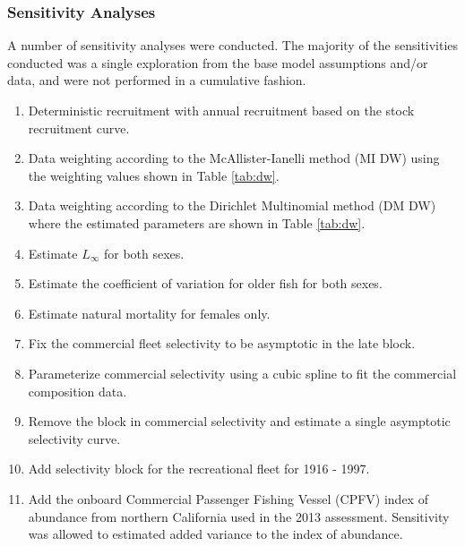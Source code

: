 \documentclass[11pt,
  english,
  a4paper,
]{article}
\begin{document}
\leavevmode\tagmcend\tagstructend\par


\hypertarget{sensitivity-analyses}{%
\subsubsection{Sensitivity Analyses}\label{sensitivity-analyses}}

\leavevmode\tagmcend\tagstructend


A number of sensitivity analyses were conducted. The majority of the sensitivities conducted was a single exploration from the base model assumptions and/or data, and were not performed in a cumulative fashion.

\leavevmode\tagmcend\tagstructend\par

\begin{enumerate}
   
  \item Deterministic recruitment with annual recruitment based on the stock recruitment curve. 

  \item Data weighting according to the McAllister-Ianelli method (MI DW) using the weighting values shown in Table \ref{tab:dw}. 
  
  \item Data weighting according to the Dirichlet Multinomial method (DM DW) where the estimated parameters are shown in Table \ref{tab:dw}. 

  \item Estimate $L_{\infty}$ for both sexes.

  \item Estimate the coefficient of variation for older fish for both sexes.

  \item Estimate natural mortality for females only.

  \item Fix the commercial fleet selectivity to be asymptotic in the late block.

  \item Parameterize commercial selectivity using a cubic spline to fit the commercial composition data. 

  \item Remove the block in commercial selectivity and estimate a single asymptotic selectivity curve. 

  \item Add selectivity block for the recreational fleet for 1916 - 1997.

  \item Add the onboard Commercial Passenger Fishing Vessel (CPFV) index of abundance from northern California used in the 2013 assessment. Sensitivity was allowed to estimated added variance to the index of abundance.
  
\end{enumerate}
\end{document}
